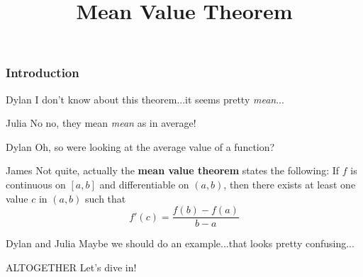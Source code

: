\documentclass{ximera}
\title{Mean Value Theorem}
\begin{document}
\maketitle
\subsubsection{Introduction}
\begin{dialogue}
\item[Dylan] I don't know about this theorem...it seems pretty \textit{mean}...
\item[Julia] No no, they mean \textit{mean} as in average!
\item[Dylan] Oh, so were looking at the average value of a function?
\item[James] Not quite, actually the \textbf{mean value theorem} states the following: If $f$ is continuous on $[a,b]$ and differentiable on $(a,b)$, then there exists at least one value $c$ in $(a,b)$ such that $$f'(c)=\frac{f(b)-f(a)}{b-a}$$
\item[Dylan and Julia] Maybe we should do an example...that looks pretty confusing...
\item[ALTOGETHER] Let's dive in!
\end{dialogue}
\end{document}
